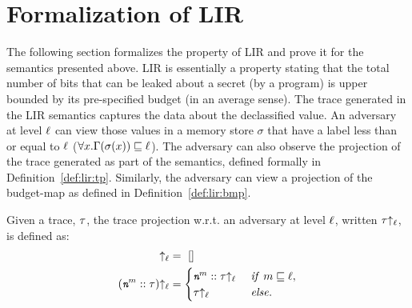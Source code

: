 \section{Formalization of LIR}
\label{sec:lir-formal}

The following section formalizes the property of LIR and prove it for
the semantics presented above. 
LIR is essentially a property stating
that the total number of bits that can be leaked about a secret (by
a program) is upper bounded by its pre-specified budget 
(in an average sense). The trace
generated in the LIR semantics captures the data about the declassified 
value. An adversary at level $\ell$ can view those values in a 
memory store $\sigma$ that have a label less than or equal to $\ell$ 
($\forall x. \Gamma(\sigma(x)) \sqsubseteq \ell$). The adversary can 
also observe the projection of the trace generated as part of the 
semantics, defined formally in Definition~\ref{def:lir:tp}. Similarly, 
the adversary can view a projection of the budget-map as defined 
in Definition~\ref{def:lir:bmp}.  

\begin{mydef}
\label{def:lir:tp}
Given a trace, $\tau$, the trace projection w.r.t. an adversary at
level $\ell$, written $\tau{\uparrow_\ell}$, is 
defined as: 
  \begin{align*}
  []\proj &=~[] \\
  (\emph{\TT{n}}^m :: \trace)\proj &=
  \begin{cases}
   \emph{\TT{n}}^m :: \trace\proj~ & \mathit{if }~ m \sqsubseteq \attacker,\\
   \trace\proj & \mathit{else}.
  \end{cases}
  \end{align*}
\end{mydef}


